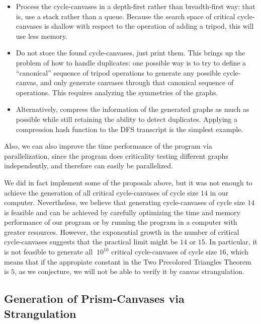\begin{itemize}
	\item Process the cycle-canvases in a depth-first rather than breadth-first way: that is,
	use a stack rather than a queue. Because the search space of critical cycle-canvases is 
	shallow with respect to the operation of adding a tripod, this will use less memory.
	\item Do not store the found cycle-canvases, just print them. This brings up the problem
	of how to handle duplicates: one possible way is to try to define a ``canonical'' sequence 		of tripod operations to generate any possible cycle-canvas, and only generate canvases
	through that canonical sequence of operations. This requires analyzing the symmetries of the
	graphs.
	\item Alternatively, compress the information of the generated graphs as much as possible
	while still retaining the ability to detect duplicates. Applying a compression hash function
	to the DFS transcript is the simplest example.

\end{itemize}

Also, we can also improve the time performance of the program via parallelization, since the program does criticality testing different graphs independently, and therefore can easily be 
parallelized.

We did in fact implement some of the proposals above, but it was not enough to achieve the 
generation of all critical cycle-canvases of cycle size $14$ in our computer. Nevertheless,
we believe that generating cycle-canvases of cycle size $14$ is feasible and can be achieved
by carefully optimizing the time and memory performance of our program or by running the program
in a computer with greater resources. However, the exponential growth in the number of critical 
cycle-canvases suggests that the practical limit might be $14$ or $15$. In particular, it is not 
feasible to generate all $~10^{10}$ critical cycle-canvases of cycle size $16$, which means that
if the appropiate constant in the Two Precolored Triangles Theorem is $5$, as we conjecture, we
will not be able to verify it by canvas strangulation.




\subsection{Generation of Prism-Canvases via Strangulation}



